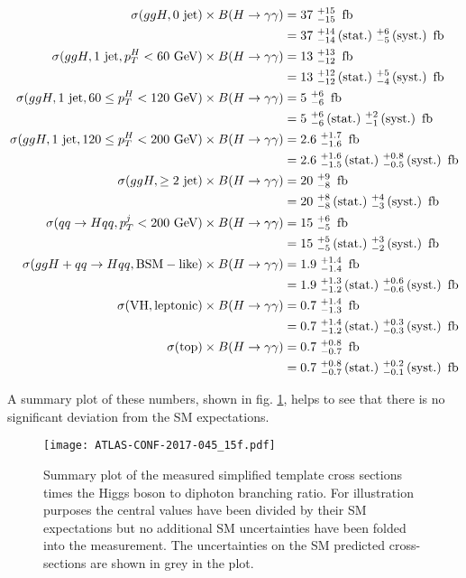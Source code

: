 \begin{align*}
  \sigma (ggH, \mathrm{0~jet}) \tbfhyy &= 37\ ^{+15}_{-15}\ \fb \\ &= 37\ ^{+14}_{-14}\,\mathrm{(stat.)}\ ^{+6}_{-5}\,\mathrm{(syst.)}\ \fb \\
  \sigma (ggH, \mathrm{1~jet}, p_T^{H} < 60\ \text{GeV}) \tbfhyy &= 13\ ^{+13}_{-12}\ \fb \\ &= 13\ ^{+12}_{-12}\,\mathrm{(stat.)}\ ^{+5}_{-4}\,\mathrm{(syst.)}\ \fb \\
  \sigma (ggH, \mathrm{1~jet}, 60 \leq p_T^{H} < 120\ \text{GeV}) \tbfhyy &= 5\ ^{+6}_{-6}\ \fb \\ &= 5\ ^{+6}_{-6}\,\mathrm{(stat.)}\ ^{+2}_{-1}\,\mathrm{(syst.)}\ \fb \\
  \sigma (ggH, \mathrm{1~jet}, 120 \leq p_T^{H} < 200\ \text{GeV}) \tbfhyy &= 2.6\ ^{+1.7}_{-1.6}\ \fb \\ &= 2.6\ ^{+1.6}_{-1.5}\,\mathrm{(stat.)}\ ^{+0.8}_{-0.5}\,\mathrm{(syst.)}\ \fb \\
  \sigma (ggH, \geq 2~\mathrm{jet}) \tbfhyy &= 20\ ^{+9}_{-8}\ \fb \\ &= 20\ ^{+8}_{-8}\,\mathrm{(stat.)}\ ^{+4}_{-3}\,\mathrm{(syst.)}\ \fb \\
  \sigma (qq \rightarrow Hqq, p_T^{j} < 200~\text{GeV}) \tbfhyy &= 15\ ^{+6}_{-5}\ \fb \\ &= 15\ ^{+5}_{-5}\,\mathrm{(stat.)}\ ^{+3}_{-2}\,\mathrm{(syst.)}\ \fb \\
  \sigma (ggH + qq \rightarrow Hqq, \mathrm{BSM-like}) \tbfhyy &= 1.9\ ^{+1.4}_{-1.4}\ \fb \\ &= 1.9\ ^{+1.3}_{-1.2}\,\mathrm{(stat.)}\ ^{+0.6}_{-0.6}\,\mathrm{(syst.)}\ \fb \\
  \sigma (\mathrm{VH, leptonic}) \tbfhyy &= 0.7\ ^{+1.4}_{-1.3}\ \fb \\ &= 0.7\ ^{+1.4}_{-1.2}\,\mathrm{(stat.)}\ ^{+0.3}_{-0.3}\,\mathrm{(syst.)}\ \fb \\
  \sigma (\mathrm{top}) \tbfhyy &= 0.7\ ^{+0.8}_{-0.7}\ \fb \\ &= 0.7\ ^{+0.8}_{-0.7}\,\mathrm{(stat.)}\ ^{+0.2}_{-0.1}\,\mathrm{(syst.)}\ \fb \\
  \end{align*}

  A summary plot of these numbers, shown in fig. \ref{fig:HGam_results_STXSSumary}, helps to see that there is no significant deviation from the SM expectations.
\begin{figure}[htbp]
\centering
\texttt{[image: ATLAS-CONF-2017-045\_15f.pdf]}
\caption{\label{fig:HGam_results_STXSSumary}
  Summary plot of the measured simplified template cross sections times the Higgs boson to diphoton branching ratio.
  For illustration purposes the central values have been divided by their SM expectations but no additional SM uncertainties have been folded into the measurement.
  The uncertainties on the SM predicted cross-sections are shown in grey in the plot.
  \cite{ATLAS-CONF-2017-045}}
\end{figure}


